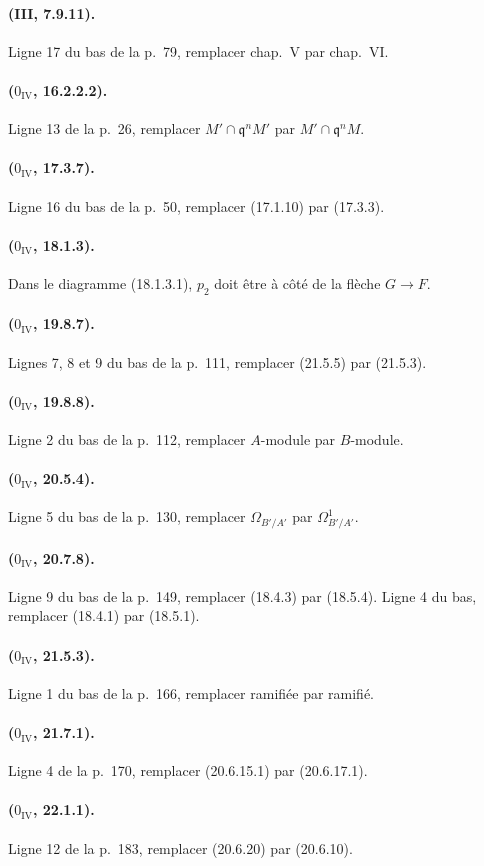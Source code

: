 \paragraph{(III, 7.9.11).}
Ligne 17 du bas de la p.~79, remplacer chap.~V par chap.~VI.

\paragraph{($0_{\mathrm{IV}}$, 16.2.2.2).}
Ligne 13 de la p.~26, remplacer $M'\cap\mathfrak q^nM'$ par
$M'\cap\mathfrak q^nM$.

\paragraph{($0_{\mathrm{IV}}$, 17.3.7).}
Ligne 16 du bas de la p.~50, remplacer (17.1.10) par (17.3.3).

\paragraph{($0_{\mathrm{IV}}$, 18.1.3).}
Dans le diagramme (18.1.3.1), $p_2$ doit être à côté de la flèche
$G\to F$.

\paragraph{($0_{\mathrm{IV}}$, 19.8.7).}
Lignes 7, 8 et 9 du bas de la p.~111, remplacer (21.5.5) par (21.5.3).

\paragraph{($0_{\mathrm{IV}}$, 19.8.8).}
Ligne 2 du bas de la p.~112, remplacer $A$-module par $B$-module.

\paragraph{($0_{\mathrm{IV}}$, 20.5.4).}
Ligne 5 du bas de la p.~130, remplacer $\Omega_{B'/A'}$ par
$\Omega^1_{B'/A'}$.

\paragraph{($0_{\mathrm{IV}}$, 20.7.8).}
Ligne 9 du bas de la p.~149, remplacer (18.4.3) par (18.5.4). Ligne 4
du bas, remplacer (18.4.1) par (18.5.1).

\paragraph{($0_{\mathrm{IV}}$, 21.5.3).}
Ligne 1 du bas de la p.~166, remplacer ramifiée par ramifié.

\paragraph{($0_{\mathrm{IV}}$, 21.7.1).}
Ligne 4 de la p.~170, remplacer (20.6.15.1) par (20.6.17.1).

\paragraph{($0_{\mathrm{IV}}$, 22.1.1).}
Ligne 12 de la p.~183, remplacer (20.6.20) par (20.6.10).

